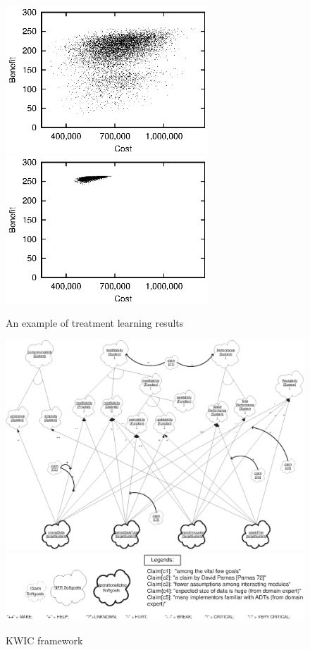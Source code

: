 \documentclass[twocolumn]{styles/IEEEtran}
\begin{document}
\begin{figure}
 \begin{center}
 \includegraphics[width=3in]{fig/JPLB4.eps}
 \includegraphics[width=3in]{fig/JPLAFTER.eps}
\caption{An example of treatment learning results}
 \label{tab:tech_example}

 \end{center}
 \end{figure}


\newpage

\begin{figure}
\begin{minipage}{.65\linewidth}
 \includegraphics[width=7in]{fig/sig.eps}
 \includegraphics[width=7in]{fig/arch_def_graph_legend.eps}
\end{minipage}\hfill

\caption{KWIC framework}
\label{fig:arch_def}

\end{figure}
\end{document}

